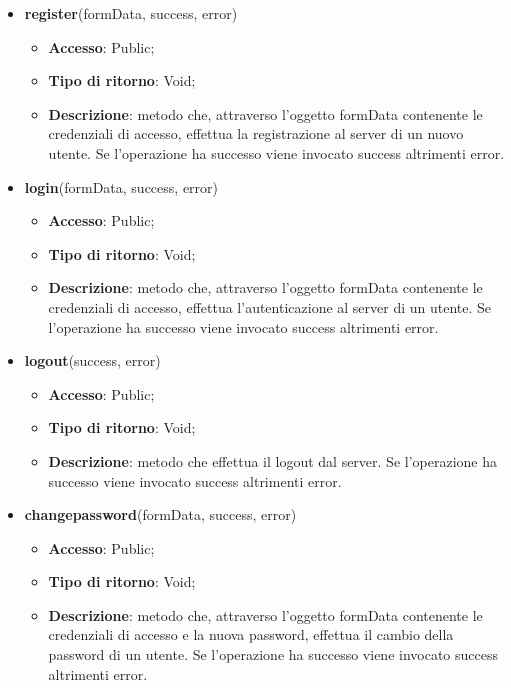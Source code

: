 {\begin{itemize}
\begin{itemize}
				\item \textbf{Descrizione}: metodo che controlla se è stato effettuato un refresh della pagina, in tal caso ripristina login.
			\end{itemize}
			\item \textbf{register}(formData, success, error)
			\begin{itemize}
				\item \textbf{Accesso}: Public;
				\item \textbf{Tipo di ritorno}: Void;
				\item \textbf{Descrizione}: metodo che, attraverso l'oggetto formData contenente le credenziali di accesso, effettua la registrazione al server di un nuovo utente. Se l'operazione ha successo viene invocato success altrimenti error.
			\end{itemize}
			\item \textbf{login}(formData, success, error)
			\begin{itemize}
				\item \textbf{Accesso}: Public;
				\item \textbf{Tipo di ritorno}: Void;
				\item \textbf{Descrizione}: metodo che, attraverso l'oggetto formData contenente le credenziali di accesso, effettua l'autenticazione al server di un utente. Se l'operazione ha successo viene invocato success altrimenti error.
			\end{itemize}
			\item \textbf{logout}(success, error)
			\begin{itemize}
				\item \textbf{Accesso}: Public;
				\item \textbf{Tipo di ritorno}: Void;
				\item \textbf{Descrizione}: metodo che effettua il logout dal server. Se l'operazione ha successo viene invocato success altrimenti error.
			\end{itemize}
			\item \textbf{changepassword}(formData, success, error)
			\begin{itemize}
				\item \textbf{Accesso}: Public;
				\item \textbf{Tipo di ritorno}: Void;
				\item \textbf{Descrizione}: metodo che, attraverso l'oggetto formData contenente le credenziali di accesso e la nuova password, effettua il cambio della password di un utente. Se l'operazione ha successo viene invocato success altrimenti error.

\end{itemize}
\end{itemize}}
